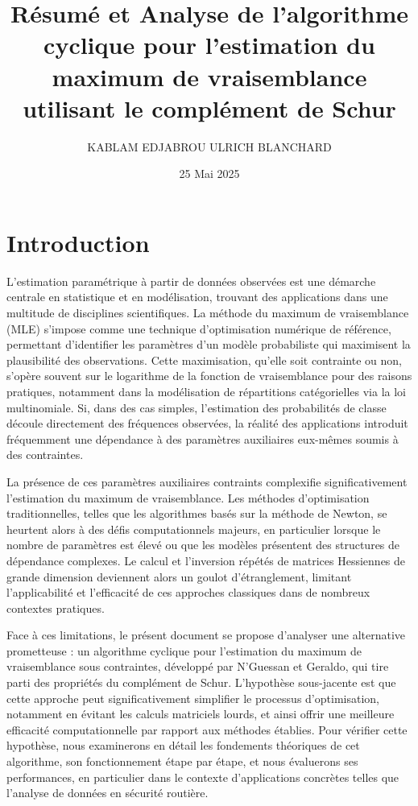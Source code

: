 \documentclass[12pt,a4paper]{article}
\title{Résumé et Analyse de l’algorithme cyclique pour l’estimation du maximum de vraisemblance utilisant le complément de Schur}
\author{KABLAM EDJABROU ULRICH BLANCHARD}
\date{25 Mai 2025} %
\begin{document}
	
	\maketitle
	
	\tableofcontents
	
	\newpage
	
	\section{Introduction}
	L'estimation paramétrique à partir de données observées est une démarche centrale en statistique et en modélisation, trouvant des applications dans une multitude de disciplines scientifiques. La méthode du maximum de vraisemblance (MLE) \cite{ref1, ref2, ref3} s'impose comme une technique d'optimisation numérique de référence, permettant d'identifier les paramètres d'un modèle probabiliste qui maximisent la plausibilité des observations. Cette maximisation, qu'elle soit contrainte ou non, s'opère souvent sur le logarithme de la fonction de vraisemblance pour des raisons pratiques, notamment dans la modélisation de répartitions catégorielles via la loi multinomiale. Si, dans des cas simples, l'estimation des probabilités de classe découle directement des fréquences observées, la réalité des applications introduit fréquemment une dépendance à des paramètres auxiliaires eux-mêmes soumis à des contraintes.
	
	La présence de ces paramètres auxiliaires contraints complexifie significativement l'estimation du maximum de vraisemblance. Les méthodes d'optimisation traditionnelles, telles que les algorithmes basés sur la méthode de Newton, se heurtent alors à des défis computationnels majeurs, en particulier lorsque le nombre de paramètres est élevé ou que les modèles présentent des structures de dépendance complexes. Le calcul et l'inversion répétés de matrices Hessiennes de grande dimension deviennent alors un goulot d'étranglement, limitant l'applicabilité et l'efficacité de ces approches classiques dans de nombreux contextes pratiques.
	
	Face à ces limitations, le présent document se propose d'analyser une alternative prometteuse : un algorithme cyclique pour l'estimation du maximum de vraisemblance sous contraintes, développé par N'Guessan et Geraldo, qui tire parti des propriétés du complément de Schur. L'hypothèse sous-jacente est que cette approche peut significativement simplifier le processus d'optimisation, notamment en évitant les calculs matriciels lourds, et ainsi offrir une meilleure efficacité computationnelle par rapport aux méthodes établies. Pour vérifier cette hypothèse, nous examinerons en détail les fondements théoriques de cet algorithme, son fonctionnement étape par étape, et nous évaluerons ses performances, en particulier dans le contexte d'applications concrètes telles que l'analyse de données en sécurité routière.
	
\end{document}
